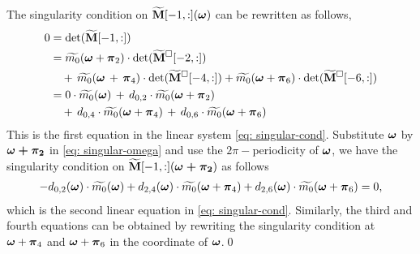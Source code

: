 The singularity condition on  $\widetilde{\mathbf{M}}[-1,:](\boldsymbol{\omega})$ can be rewritten as follows,
\begin{align}\label{eq: singular-omega}
0 &=\det(\widetilde{\mathbf{M}}[-1,:]) \notag\\
&=  \widetilde{m_0}(\boldsymbol{\omega}+\boldsymbol{\pi}_2)\cdot\det(\widetilde{\mathbf{M}}^{\Box}[-2,:])\notag\\
&\quad+ \,\widetilde{m_0}(\boldsymbol{\omega}\,+\,\boldsymbol{\pi}_4)\cdot\det(\widetilde{\mathbf{M}}^{\Box}[-4,:])
+ \widetilde{m_0}(\boldsymbol{\omega}+\boldsymbol{\pi}_6)\cdot\det(\widetilde{\mathbf{M}}^{\Box}[-6,:])\notag\\
&= 0\cdot\widetilde{m_0}(\boldsymbol{\omega})\,+\,d_{0,2}\cdot\widetilde{m_0}(\boldsymbol{\omega}+\boldsymbol{\pi}_2) \notag\\
&\quad+\,d_{0,4}\cdot \widetilde{m_0}(\boldsymbol{\omega} + \boldsymbol{\pi}_4)\,+\, d_{0,6}\cdot\widetilde{m_0}(\boldsymbol{\omega} + \boldsymbol{\pi}_6) 
\end{align}
This is the first equation in the linear system \eqref{eq: singular-cond}. Substitute $\boldsymbol{\omega}$ by $\boldsymbol{\omega + \pi_2}$ in \eqref{eq: singular-omega} and use the $2\pi-$periodicity of $\boldsymbol{\omega}$, we have the singularity condition on $\widetilde{\mathbf{M}}[-1,:](\boldsymbol{\omega+\pi_2})$ as follows
\begin{align*}
-d_{0,2}(\boldsymbol{\omega})\cdot \widetilde{m_0}(\boldsymbol{\omega}) + d_{2,4}(\boldsymbol{\omega})\cdot \widetilde{m_0}(\boldsymbol{\omega}+\boldsymbol{\pi}_4) + d_{2,6}(\boldsymbol{\omega})\cdot\widetilde{m_0}(\boldsymbol{\omega}+\boldsymbol{\pi}_6) = 0,
\end{align*}
which is the second linear equation in  \eqref{eq: singular-cond}.
Similarly, the third and fourth equations can be obtained by rewriting the singularity condition at $\boldsymbol{\omega}+\boldsymbol{\pi}_4$ and $\boldsymbol{\omega}+\boldsymbol{\pi}_6$ in the coordinate of $\boldsymbol{\omega}$.\qed


